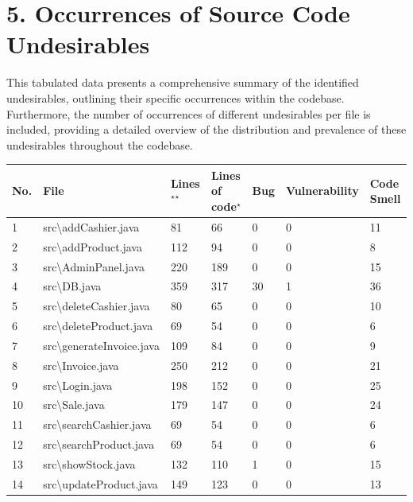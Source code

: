 \documentclass[12pt,letterpaper]{report}
\begin{document}
\section*{5. Occurrences of Source Code Undesirables}
\normalsize{
This tabulated data presents a comprehensive summary of the identified undesirables, outlining their specific occurrences within the codebase.  Furthermore, the number of occurrences of different undesirables per file is included, providing a detailed overview of the distribution and prevalence of these undesirables throughout the codebase.\\

\begin{table}[h!]
\begin{tabular}{|l|l|l|l|l|l|l|} 
\hline
\textbf{No.} & \textbf{File} & \textbf{Lines}${}^\star$${}^\star$ & \textbf{Lines of code}${}^\star$ & \textbf{Bug} & \textbf{Vulnerability} & \textbf{Code Smell} \\
\hline
1 & src\textbackslash{addCashier.java} & 81 & 66 & 0 & 0 & 11 \\
\hline
2 & src\textbackslash{addProduct.java} & 112 & 94 & 0 & 0 & 8 \\
\hline
3 & src\textbackslash{AdminPanel.java} & 220 & 189 & 0 & 0 & 15 \\
\hline
4 & src\textbackslash{DB.java} & 359 & 317 & 30 & 1 & 36 \\
\hline
5 & src\textbackslash{deleteCashier.java} & 80 & 65 & 0 & 0 & 10 \\
\hline
6 & src\textbackslash{deleteProduct.java} & 69 & 54 & 0 & 0 & 6 \\
\hline
7 & src\textbackslash{generateInvoice.java} & 109 & 84 & 0 & 0 & 9 \\
\hline
8 & src\textbackslash{Invoice.java} & 250 & 212 & 0 & 0 & 21 \\
\hline
9 & src\textbackslash{Login.java} & 198 & 152 & 0 & 0 & 25\\
\hline
10 & src\textbackslash{Sale.java} & 179 & 147 & 0 & 0 & 24 \\
\hline
11 & src\textbackslash{searchCashier.java} & 69 & 54 & 0 & 0 & 6 \\
\hline
12 & src\textbackslash{searchProduct.java} & 69 & 54 & 0 & 0 & 6 \\
\hline
13 & src\textbackslash{showStock.java} & 132 & 110 & 1 & 0 & 15 \\
\hline
14 & src\textbackslash{updateProduct.java} & 149 & 123 & 0 & 0 & 13 \\
\hline
\hline


\end{tabular}
\end{table}}
\end{document}
